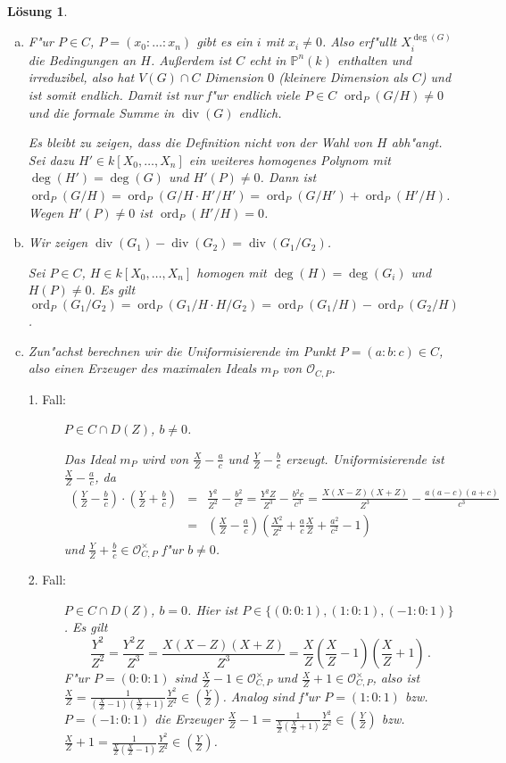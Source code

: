 \documentclass[a4paper, 12pt, numbers=noendperiod, chapterprefix=true, headsepline]{scrbook}
\theoremstyle{break}
\newtheorem{Loes}{L\"osung}
\theoremstyle{nonumberbreak}
\theoremstyle{nonumberplain}
\DeclareMathOperator{\Divisor}{div}
\DeclareMathOperator{\ord}{ord}
\newcommand{\IP}{\mathbb{P}}%
\newcommand{\calO}{\mathcal{O}}
\begin{document}
\begin{Loes}\begin{enumerate}[a)]
\item
	F"ur $P \in C$, $P = (x_0 \colon \dots \colon x_n)$ gibt es ein $i$ mit $x_i \neq 0$. Also erf"ullt $X_i^{\deg(G)}$ die Bedingungen an $H$. Au\ss erdem ist $C$ echt in $\IP^n(k)$ enthalten und irreduzibel, also hat $V(G) \cap C$ Dimension $0$ (kleinere Dimension als $C$) und ist somit endlich. Damit ist nur f"ur endlich viele $P \in C$ $\ord_P(G/H) \neq 0$ und die formale Summe in $\Divisor(G)$ endlich.
 
	Es bleibt zu zeigen, dass die Definition nicht von der Wahl von $H$ abh"angt. Sei dazu $H' \in k[X_0, \dots, X_n]$ ein weiteres homogenes Polynom mit $\deg(H') = \deg (G)$ und $H'(P) \neq 0$. Dann ist $\ord_P(G/H) = \ord_P(G/H \cdot H'/H') = \ord_P(G/H') + \ord_P(H'/H)$. Wegen $H'(P) \neq 0$ ist $\ord_P(H'/H) = 0$.
\item
	Wir zeigen $\Divisor(G_1) - \Divisor(G_2) = \Divisor(G_1/G_2)$.

	Sei $P \in C$, $H \in k[X_0, \dots, X_n]$ homogen mit $\deg(H) = \deg(G_i)$ und $H(P) \neq 0$. Es gilt $\ord_P(G_1/G_2) = \ord_P(G_1/H \cdot H /G_2) = \ord_P(G_1/H) - \ord_P(G_2/H)$.
\item
	 Zun"achst berechnen wir die Uniformisierende im Punkt $P = (a : b : c) \in C$, also einen Erzeuger des maximalen Ideals $m_P$ von $\calO_{C,P}$. 
	\begin{description}
	\item[1. Fall:]
		$P \in C \cap D(Z)$, $b \neq 0$.

		Das Ideal $m_P$ wird von $\frac{X}{Z} - \frac{a}{c}$ und $\frac{Y}{Z} - \frac{b}{c}$ erzeugt. Uniformisierende ist $\frac{X}{Z} - \frac{a}{c}$, da 
		\begin{eqnarray*}
			\left(\frac{Y}{Z} - \frac{b}{c}\right) \cdot \left(\frac{Y}{Z} + \frac{b}{c}\right)
			&=& \frac{Y^2}{Z^2} - \frac{b^2}{c^2} 
			= \frac{Y^2Z}{Z^3} - \frac{b^2c}{c^3} 
			= \frac{X(X-Z)(X+Z)}{Z^3} - \frac{a(a-c)(a+c)}{c^3}\\
			&=& \left(\frac{X}{Z} - \frac{a}{c}\right) \left(\frac{X^2}{Z^2} + \frac{a}{c} \frac{X}{Z} + \frac{a^2}{c^2} - 1\right)
		\end{eqnarray*}
		und $\frac{Y}{Z} + \frac{b}{c} \in \calO_{C,P}^\times$ f"ur $b \neq 0$.
	\item[2. Fall:]
		$P \in C \cap D(Z)$, $b = 0$. Hier ist $P \in \{(0:0:1), (1:0:1), (-1:0:1)\}$. Es gilt
			\[\frac{Y^2}{Z^2} = \frac{Y^2Z}{Z^3} = \frac{X(X-Z)(X+Z)}{Z^3} = \frac{X}{Z} \left(\frac{X}{Z} -1\right)\left(\frac{X}{Z} +1\right)\,.\]
		F"ur $P = (0:0:1)$ sind $\frac{X}{Z} -1 \in \calO_{C,P}^\times$ und $\frac{X}{Z} +1 \in \calO_{C,P}^\times$, also ist $\frac{X}{Z} = \frac{1}{(\frac{X}{Z} -1)(\frac{X}{Z} +1)} \frac{Y^2}{Z^2} \in (\frac{Y}{Z})$. Analog sind f"ur $P = (1:0:1)$ bzw. $P = (-1:0:1)$ die Erzeuger $\frac{X}{Z} - 1 = \frac{1}{\frac{X}{Z}(\frac{X}{Z} +1)} \frac{Y^2}{Z^2} \in \left(\frac{Y}{Z}\right)$ bzw. $\frac{X}{Z} + 1 = \frac{1}{\frac{X}{Z}(\frac{X}{Z} - 1)} \frac{Y^2}{Z^2} \in \left(\frac{Y}{Z}\right)$.


\end{description}
\end{enumerate}
\end{Loes}
\end{document}
